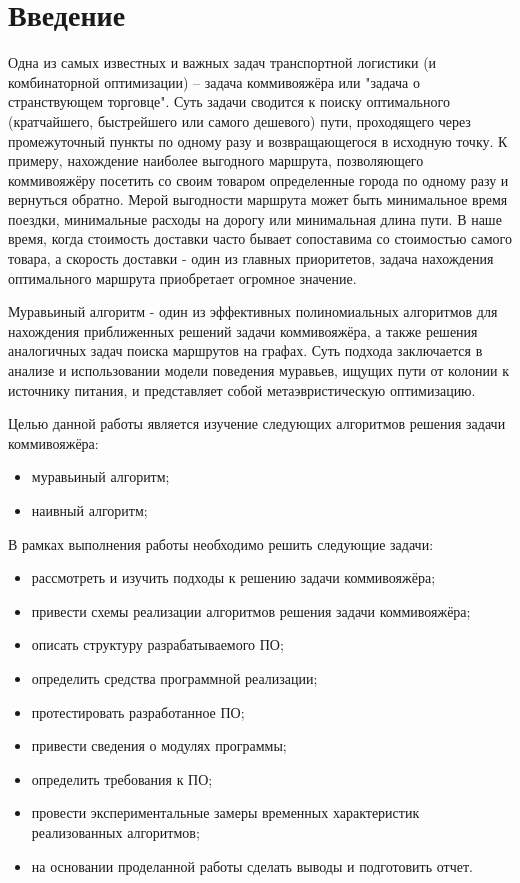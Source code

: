 \chapter*{Введение}

Одна из самых известных и важных задач транспортной логистики (и комбинаторной оптимизации) – задача коммивояжёра или "задача о странствующем торговце". Суть задачи сводится к поиску оптимального (кратчайшего, быстрейшего или самого дешевого) пути, проходящего через промежуточный пункты по одному разу и возвращающегося в исходную точку. К примеру, нахождение наиболее выгодного маршрута, позволяющего коммивояжёру посетить со своим товаром определенные города по одному разу и вернуться обратно. Мерой выгодности маршрута может быть минимальное время поездки, минимальные расходы на дорогу или минимальная длина пути. В наше время, когда стоимость доставки часто бывает сопоставима со стоимостью самого товара, а скорость доставки - один из главных приоритетов, задача нахождения оптимального маршрута приобретает огромное значение.   

Муравьиный алгоритм - один из эффективных полиномиальных алгоритмов для нахождения приближенных решений задачи коммивояжёра, а также решения аналогичных задач поиска маршрутов на графах. Суть подхода заключается в анализе и использовании модели поведения муравьев, ищущих пути от колонии к источнику питания, и представляет собой метаэвристическую оптимизацию.

Целью данной работы является изучение следующих алгоритмов решения задачи коммивояжёра: 
\begin{itemize}
	\item муравьиный алгоритм;
	\item наивный алгоритм;
\end{itemize} 

В рамках выполнения работы необходимо решить следующие задачи:
\begin{itemize}
	\item рассмотреть и изучить подходы к решению задачи коммивояжёра;
	\item привести схемы реализации алгоритмов решения задачи коммивояжёра;
	\item описать структуру разрабатываемого ПО;
	\item определить средства программной реализации;
	\item протестировать разработанное ПО;
	\item привести сведения о модулях программы;
	\item определить требования к ПО;
	\item провести экспериментальные замеры временных характеристик реализованных алгоритмов;
	\item на основании проделанной работы сделать выводы и подготовить отчет.
\end{itemize}